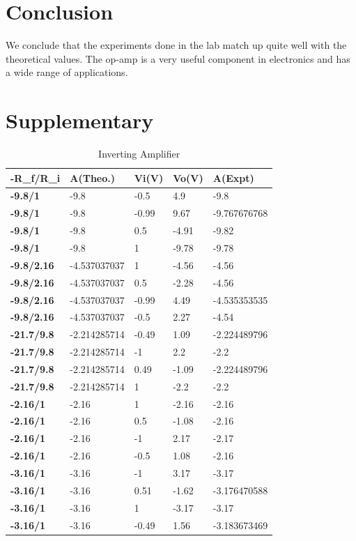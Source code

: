 \documentclass{scrartcl}
\newcommand{\1}{\mathbbm{1}}
\begin{document}
\section{Conclusion}
    We conclude that the experiments done in the lab match up quite well with the theoretical values. The op-amp is a very useful component in electronics and has a wide range of applications.
\newpage
\section{Supplementary}
\begin{table}[!ht]
    \centering
    \begin{tabular}{|l|l|l|l|l|}
    \hline
        \textbf{-R\_f/R\_i} & \textbf{A(Theo.)} & \textbf{Vi(V)} & \textbf{Vo(V)} & \textbf{A(Expt)} \\ \hline
        \textbf{-9.8/1} & -9.8 & -0.5 & 4.9 & -9.8 \\ \hline
        \textbf{-9.8/1} & -9.8 & -0.99 & 9.67 & -9.767676768 \\ \hline
        \textbf{-9.8/1} & -9.8 & 0.5 & -4.91 & -9.82 \\ \hline
        \textbf{-9.8/1} & -9.8 & 1 & -9.78 & -9.78 \\ \hline
        \textbf{-9.8/2.16} & -4.537037037 & 1 & -4.56 & -4.56 \\ \hline
        \textbf{-9.8/2.16} & -4.537037037 & 0.5 & -2.28 & -4.56 \\ \hline
        \textbf{-9.8/2.16} & -4.537037037 & -0.99 & 4.49 & -4.535353535 \\ \hline
        \textbf{-9.8/2.16} & -4.537037037 & -0.5 & 2.27 & -4.54 \\ \hline
        \textbf{-21.7/9.8} & -2.214285714 & -0.49 & 1.09 & -2.224489796 \\ \hline
        \textbf{-21.7/9.8} & -2.214285714 & -1 & 2.2 & -2.2 \\ \hline
        \textbf{-21.7/9.8} & -2.214285714 & 0.49 & -1.09 & -2.224489796 \\ \hline
        \textbf{-21.7/9.8} & -2.214285714 & 1 & -2.2 & -2.2 \\ \hline
        \textbf{-2.16/1} & -2.16 & 1 & -2.16 & -2.16 \\ \hline
        \textbf{-2.16/1} & -2.16 & 0.5 & -1.08 & -2.16 \\ \hline
        \textbf{-2.16/1} & -2.16 & -1 & 2.17 & -2.17 \\ \hline
        \textbf{-2.16/1} & -2.16 & -0.5 & 1.08 & -2.16 \\ \hline
        \textbf{-3.16/1} & -3.16 & -1 & 3.17 & -3.17 \\ \hline
        \textbf{-3.16/1} & -3.16 & 0.51 & -1.62 & -3.176470588 \\ \hline
        \textbf{-3.16/1} & -3.16 & 1 & -3.17 & -3.17 \\ \hline
        \textbf{-3.16/1} & -3.16 & -0.49 & 1.56 & -3.183673469 \\ \hline
    \end{tabular}
    \label{inv}
    \caption{Inverting Amplifier}
\end{table}
\end{document}
